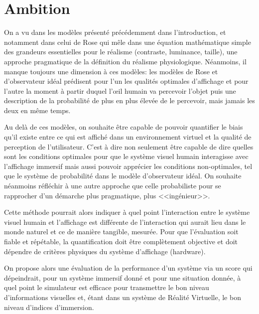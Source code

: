 	\section{Ambition}	
	\par On a vu dans les modèles présenté précédemment dans l'introduction, et notamment dans celui de Rose qui mêle dans une équation mathématique simple des grandeurs essentielles pour le réalisme (contraste, luminance, taille), une approche pragmatique de la définition du réalisme physiologique. Néanmoins, il manque toujours une dimension à ces modèles: les modèles de Rose et d'observateur idéal prédisent pour l'un les qualités optimales d'affichage et pour l'autre la moment à partir duquel l'œil humain va percevoir l'objet puis une description de la probabilité de plus en plus élevée de le percevoir, mais jamais les deux en même temps.
	
	\par Au delà de ces modèles, on souhaite être capable de pouvoir quantifier le biais qu'il existe entre ce qui est affiché dans un environnement virtuel et la qualité de perception de l'utilisateur. C'est à dire non seulement être capable de dire quelles sont les conditions optimales pour que le système visuel humain interagisse avec l'affichage immersif mais aussi pouvoir apprécier les conditions non-optimales, tel que le système de probabilité dans le modèle d'observateur idéal. On souhaite néanmoins réfléchir à une autre approche que celle probabiliste pour se rapprocher d'un démarche plus pragmatique, plus <<ingénieur>>.
	
	\par Cette méthode pourrait alors indiquer à quel point l'interaction entre le système visuel humain et l'affichage est différente de l'interaction qui aurait lieu dans le monde naturel et ce de manière tangible, mesurée. Pour que l'évaluation soit fiable et répétable, la quantification doit être complètement objective et doit dépendre de critères physiques du système d'affichage (hardware).
	
	\par On propose alors une évaluation de la performance d'un système via un score qui dépeindrait, pour un système immersif donné et pour une situation donnée, à quel point le simulateur est efficace pour transmettre le bon niveau d'informations visuelles et, étant dans un système de Réalité Virtuelle, le bon niveau d'indices d'immersion.
	
